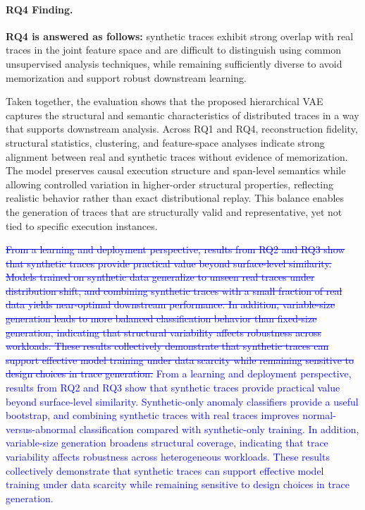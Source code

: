 \documentclass[sigconf,review]{acmart}
\begin{document}
\paragraph{RQ4 Finding.}
\textbf{RQ4 is answered as follows:} synthetic traces exhibit strong overlap with real traces in the joint feature space and are difficult to distinguish using common unsupervised analysis techniques, while remaining sufficiently diverse to avoid memorization and support robust downstream learning.

Taken together, the evaluation shows that the proposed hierarchical VAE captures the structural and semantic characteristics of distributed traces in a way that supports downstream analysis. Across RQ1 and RQ4, reconstruction fidelity, structural statistics, clustering, and feature-space analyses indicate strong alignment between real and synthetic traces without evidence of memorization. The model preserves causal execution structure and span-level semantics while allowing controlled variation in higher-order structural properties, reflecting realistic behavior rather than exact distributional replay. This balance enables the generation of traces that are structurally valid and representative, yet not tied to specific execution instances.

\textcolor{blue}{\sout{From a learning and deployment perspective, results from RQ2 and RQ3 show that synthetic traces provide practical value beyond surface-level similarity. Models trained on synthetic data generalize to unseen real traces under distribution shift, and combining synthetic traces with a small fraction of real data yields near-optimal downstream performance. In addition, variable-size generation leads to more balanced classification behavior than fixed-size generation, indicating that structural variability affects robustness across workloads. These results collectively demonstrate that synthetic traces can support effective model training under data scarcity while remaining sensitive to design choices in trace generation.}}
\textcolor{blue}{From a learning and deployment perspective, results from RQ2 and RQ3 show that synthetic traces provide practical value beyond surface-level similarity. Synthetic-only anomaly classifiers provide a useful bootstrap, and combining synthetic traces with real traces improves normal-versus-abnormal classification compared with synthetic-only training. In addition, variable-size generation broadens structural coverage, indicating that trace variability affects robustness across heterogeneous workloads. These results collectively demonstrate that synthetic traces can support effective model training under data scarcity while remaining sensitive to design choices in trace generation.}
\end{document}

